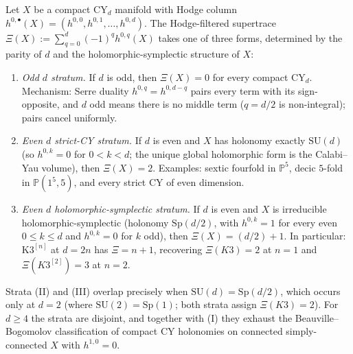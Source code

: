 \begin{theorem}
\label{thm:cy-d-tri-stratum}
Let $X$ be a compact CY$_d$ manifold with Hodge column
$h^{0, \bullet}(X) = (h^{0, 0}, h^{0, 1}, \ldots, h^{0, d})$. The
Hodge-filtered supertrace
$\Xi(X) := \sum_{q = 0}^d (-1)^q h^{0, q}(X)$
takes one of three forms, determined by the parity of $d$ and the
holomorphic-symplectic structure of $X$:
\begin{enumerate}
 \item[\textup{(I)}] \emph{Odd $d$ stratum.} If $d$ is odd, then
 $\Xi(X) = 0$ for every compact CY$_d$. Mechanism: Serre duality
 $h^{0, q} = h^{0, d - q}$ pairs every term with its sign-opposite,
 and $d$ odd means there is no middle term ($q = d/2$ is
 non-integral); pairs cancel uniformly.
 \item[\textup{(II)}] \emph{Even $d$ strict-CY stratum.} If $d$ is even
 and $X$ has holonomy exactly $\mathrm{SU}(d)$ \textup{(}so
 $h^{0, k} = 0$ for $0 < k < d$; the unique global holomorphic
 form is the Calabi--Yau volume\textup{),} then
 $\Xi(X) = 2$. Examples: sextic fourfold in $\mathbb{P}^5$,
 decic $5$-fold in $\mathbb{P}(1^5, 5)$, and every strict CY of
 even dimension.
 \item[\textup{(III)}] \emph{Even $d$ holomorphic-symplectic stratum.}
 If $d$ is even and $X$ is irreducible holomorphic-symplectic
 \textup{(}holonomy $\mathrm{Sp}(d/2)$, with
 $h^{0, k} = 1$ for every even $0 \leq k \leq d$ and
 $h^{0, k} = 0$ for $k$ odd\textup{),} then
 $\Xi(X) = (d/2) + 1$. In particular: K$3^{[n]}$ at
 $d = 2n$ has $\Xi = n + 1$, recovering $\Xi(K3) = 2$ at $n = 1$
 and $\Xi(K3^{[2]}) = 3$ at $n = 2$.
\end{enumerate}
Strata \textup{(II)} and \textup{(III)} overlap precisely when
$\mathrm{SU}(d) = \mathrm{Sp}(d/2)$, which occurs only at $d = 2$
\textup{(}where $\mathrm{SU}(2) = \mathrm{Sp}(1)$; both strata assign
$\Xi(K3) = 2$\textup{).} For $d \geq 4$ the strata are disjoint, and
together with \textup{(I)} they exhaust the Beauville--Bogomolov
classification of compact CY holonomies on connected simply-connected
$X$ with $h^{1, 0} = 0$.
\end{theorem}

